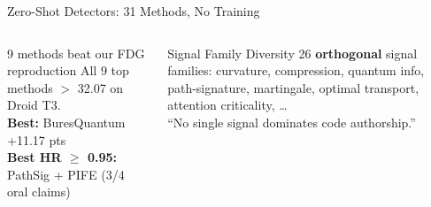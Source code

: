 \documentclass[aspectratio=169, 10pt]{beamer}
\begin{document}
\begin{frame}{Zero-Shot Detectors: 31 Methods, No Training}
\begin{columns}[T]
\begin{exampleblock}{\scriptsize 9 methods beat our FDG reproduction}
\scriptsize
All 9 top methods $>$ 32.07 on Droid T3.\\
\textbf{Best:} BuresQuantum +11.17 pts\\
\textbf{Best HR $\geq$ 0.95:} PathSig + PIFE (3/4 oral claims)
\end{exampleblock}

\begin{block}{\scriptsize Signal Family Diversity}
\scriptsize
26 \textbf{orthogonal} signal families: curvature, compression, quantum info, path-signature, martingale, optimal transport, attention criticality, \ldots\\
``No single signal dominates code authorship.''
\end{block}
\end{columns}
\end{frame}
\end{document}
